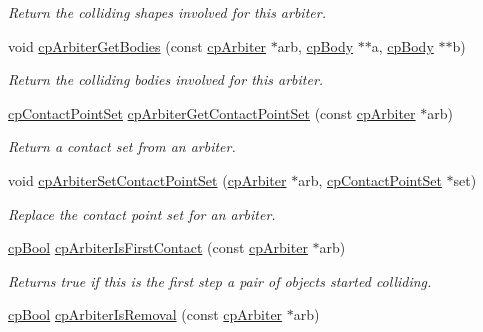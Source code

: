 \begin{DoxyCompactItemize}
\begin{DoxyCompactList}\small\item\em Return the colliding shapes involved for this arbiter. \end{DoxyCompactList}\item 
void \hyperlink{group__cp_arbiter_gad5a9d27724cc0f06b0eee2b73ef9e79b}{cp\+Arbiter\+Get\+Bodies} (const \hyperlink{structcp_arbiter}{cp\+Arbiter} $\ast$arb, \hyperlink{structcp_body}{cp\+Body} $\ast$$\ast$a, \hyperlink{structcp_body}{cp\+Body} $\ast$$\ast$b)
\begin{DoxyCompactList}\small\item\em Return the colliding bodies involved for this arbiter. \end{DoxyCompactList}\item 
\hypertarget{group__cp_arbiter_gada18a6cf4d44ef1fea136f97f3351d66}{}\hyperlink{structcp_contact_point_set}{cp\+Contact\+Point\+Set} \hyperlink{group__cp_arbiter_gada18a6cf4d44ef1fea136f97f3351d66}{cp\+Arbiter\+Get\+Contact\+Point\+Set} (const \hyperlink{structcp_arbiter}{cp\+Arbiter} $\ast$arb)\label{group__cp_arbiter_gada18a6cf4d44ef1fea136f97f3351d66}

\begin{DoxyCompactList}\small\item\em Return a contact set from an arbiter. \end{DoxyCompactList}\item 
void \hyperlink{group__cp_arbiter_ga42b070a1444350ee824bd2c770366435}{cp\+Arbiter\+Set\+Contact\+Point\+Set} (\hyperlink{structcp_arbiter}{cp\+Arbiter} $\ast$arb, \hyperlink{structcp_contact_point_set}{cp\+Contact\+Point\+Set} $\ast$set)
\begin{DoxyCompactList}\small\item\em Replace the contact point set for an arbiter. \end{DoxyCompactList}\item 
\hypertarget{group__cp_arbiter_ga18fc6adcc84fb76806c244c7ed3fb8a2}{}\hyperlink{group__basic_types_gabc5e752c48f3449ca26ef413ecbd647e}{cp\+Bool} \hyperlink{group__cp_arbiter_ga18fc6adcc84fb76806c244c7ed3fb8a2}{cp\+Arbiter\+Is\+First\+Contact} (const \hyperlink{structcp_arbiter}{cp\+Arbiter} $\ast$arb)\label{group__cp_arbiter_ga18fc6adcc84fb76806c244c7ed3fb8a2}

\begin{DoxyCompactList}\small\item\em Returns true if this is the first step a pair of objects started colliding. \end{DoxyCompactList}\item 
\hypertarget{group__cp_arbiter_ga5b5e7f8f3838bb112a05ffa406c58177}{}\hyperlink{group__basic_types_gabc5e752c48f3449ca26ef413ecbd647e}{cp\+Bool} \hyperlink{group__cp_arbiter_ga5b5e7f8f3838bb112a05ffa406c58177}{cp\+Arbiter\+Is\+Removal} (const \hyperlink{structcp_arbiter}{cp\+Arbiter} $\ast$arb)\label{group__cp_arbiter_ga5b5e7f8f3838bb112a05ffa406c58177}


\end{DoxyCompactItemize}
